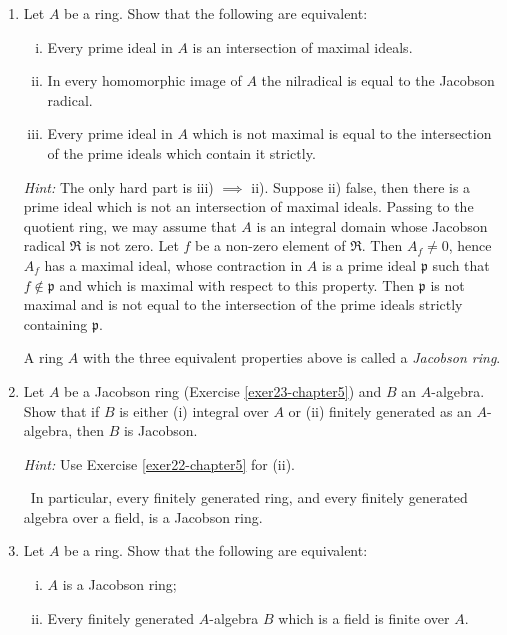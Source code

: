\begin{enumerate}
    \item \label{exer23-chapter5}Let $A$ be a ring. Show that the following are equivalent:
    \begin{enumerate}[i)]
        \item Every prime ideal in $A$ is an intersection of maximal ideals.
        \item In every homomorphic image of $A$ the nilradical is equal to the Jacobson radical.
        \item Every prime ideal in $A$ which is not maximal is equal to the intersection of the prime ideals which contain it strictly.
    \end{enumerate}
    \textit{Hint:} The only hard part is iii) $\implies$ ii). Suppose ii) false, then there is a prime ideal which is not an intersection of maximal ideals. Passing to the quotient ring, we may assume that $A$ is an integral domain whose Jacobson radical $\mathfrak{R}$ is not zero. Let $f$ be a non-zero element of $\mathfrak{R}$. Then $A_f \neq 0$, hence $A_f$ has a maximal ideal, whose contraction in $A$ is a prime ideal $\mathfrak{p}$ such that $f \notin \mathfrak{p}$ and which is maximal with respect to this property. Then $\mathfrak{p}$ is not maximal and is not equal to the intersection of the prime ideals strictly containing $\mathfrak{p}$.

    A ring $A$ with the three equivalent properties above is called a \emph{Jacobson ring}.

    \item \label{exer24-chapter5}Let $A$ be a Jacobson ring (Exercise \ref{exer23-chapter5}) and $B$ an $A$-algebra. Show that if $B$ is either (i) integral over $A$ or (ii) finitely generated as an $A$-algebra, then $B$ is Jacobson.
    
    \textit{Hint:} Use Exercise \ref{exer22-chapter5} for (ii).

    \quad\, In particular, every finitely generated ring, and every finitely generated algebra over a field, is a Jacobson ring.

    \item \label{exer25-chapter5}Let $A$ be a ring. Show that the following are equivalent:
    \begin{enumerate}[i)]
        \item $A$ is a Jacobson ring;
        \item Every finitely generated $A$-algebra $B$ which is a field is finite over $A$.
    \end{enumerate}


\end{enumerate}
